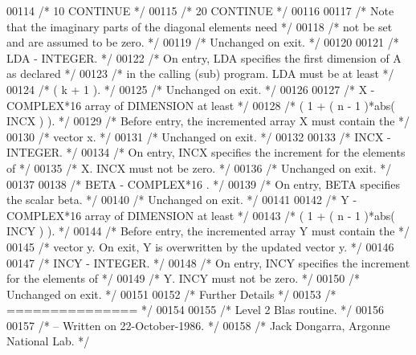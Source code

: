 \begin{DoxyCode}
00114 \textcolor{comment}{/*              10    CONTINUE */}
00115 \textcolor{comment}{/*              20 CONTINUE */}
00116 
00117 \textcolor{comment}{/*           Note that the imaginary parts of the diagonal elements need */}
00118 \textcolor{comment}{/*           not be set and are assumed to be zero. */}
00119 \textcolor{comment}{/*           Unchanged on exit. */}
00120 
00121 \textcolor{comment}{/*  LDA    - INTEGER. */}
00122 \textcolor{comment}{/*           On entry, LDA specifies the first dimension of A as declared */}
00123 \textcolor{comment}{/*           in the calling (sub) program. LDA must be at least */}
00124 \textcolor{comment}{/*           ( k + 1 ). */}
00125 \textcolor{comment}{/*           Unchanged on exit. */}
00126 
00127 \textcolor{comment}{/*  X      - COMPLEX*16       array of DIMENSION at least */}
00128 \textcolor{comment}{/*           ( 1 + ( n - 1 )*abs( INCX ) ). */}
00129 \textcolor{comment}{/*           Before entry, the incremented array X must contain the */}
00130 \textcolor{comment}{/*           vector x. */}
00131 \textcolor{comment}{/*           Unchanged on exit. */}
00132 
00133 \textcolor{comment}{/*  INCX   - INTEGER. */}
00134 \textcolor{comment}{/*           On entry, INCX specifies the increment for the elements of */}
00135 \textcolor{comment}{/*           X. INCX must not be zero. */}
00136 \textcolor{comment}{/*           Unchanged on exit. */}
00137 
00138 \textcolor{comment}{/*  BETA   - COMPLEX*16      . */}
00139 \textcolor{comment}{/*           On entry, BETA specifies the scalar beta. */}
00140 \textcolor{comment}{/*           Unchanged on exit. */}
00141 
00142 \textcolor{comment}{/*  Y      - COMPLEX*16       array of DIMENSION at least */}
00143 \textcolor{comment}{/*           ( 1 + ( n - 1 )*abs( INCY ) ). */}
00144 \textcolor{comment}{/*           Before entry, the incremented array Y must contain the */}
00145 \textcolor{comment}{/*           vector y. On exit, Y is overwritten by the updated vector y. */}
00146 
00147 \textcolor{comment}{/*  INCY   - INTEGER. */}
00148 \textcolor{comment}{/*           On entry, INCY specifies the increment for the elements of */}
00149 \textcolor{comment}{/*           Y. INCY must not be zero. */}
00150 \textcolor{comment}{/*           Unchanged on exit. */}
00151 
00152 \textcolor{comment}{/*  Further Details */}
00153 \textcolor{comment}{/*  =============== */}
00154 
00155 \textcolor{comment}{/*  Level 2 Blas routine. */}
00156 
00157 \textcolor{comment}{/*  -- Written on 22-October-1986. */}
00158 \textcolor{comment}{/*     Jack Dongarra, Argonne National Lab. */}

\end{DoxyCode}

